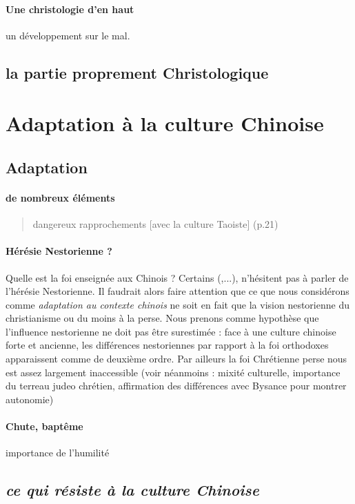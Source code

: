 \paragraph{Une christologie d'en haut} un développement sur le mal. 

\subsection{la partie proprement Christologique}




\section{Adaptation à la culture Chinoise}

\subsection{Adaptation}

\paragraph{de nombreux éléments  }
\begin{quote}
    dangereux rapprochements [avec la culture Taoiste] (p.21)
\end{quote}
\cite{Havret:stelechretienne}


\paragraph{Hérésie Nestorienne ?} Quelle est la foi enseignée aux Chinois ? Certains (\cite{Gernet:Stele},...), n'hésitent pas à parler de l'hérésie Nestorienne. Il faudrait alors faire attention que ce que nous considérons comme \textit{adaptation au contexte chinois} ne soit en fait que la vision nestorienne du christianisme ou du moins à la perse. Nous prenons comme hypothèse que l'influence nestorienne ne doit pas être surestimée : face à une culture chinoise forte et ancienne, les différences nestoriennes par rapport à la foi orthodoxes apparaissent comme de deuxième ordre. Par ailleurs la foi Chrétienne perse nous est assez largement inaccessible (voir néanmoins \cite{Amir:CoranHistoriens}  : mixité culturelle, importance du terreau judeo chrétien, affirmation des différences avec Bysance pour montrer autonomie) 

\paragraph{Chute, baptême} importance de l'humilité

 \subsection{\textit{ce qui résiste à la culture Chinoise}}

